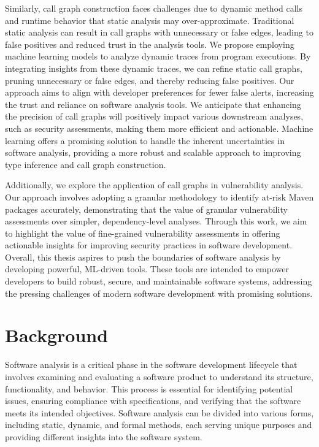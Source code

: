 Similarly, call graph construction faces challenges due to dynamic method calls and runtime behavior that static analysis may over-approximate. Traditional static analysis can result in call graphs with unnecessary or false edges, leading to false positives and reduced trust in the analysis tools. We propose employing machine learning models to analyze dynamic traces from program executions. By integrating insights from these dynamic traces, we can refine static call graphs, pruning unnecessary or false edges, and thereby reducing false positives. Our approach aims to align with developer preferences for fewer false alerts, increasing the trust and reliance on software analysis tools. We anticipate that enhancing the precision of call graphs will positively impact various downstream analyses, such as security assessments, making them more efficient and actionable. Machine learning offers a promising solution to handle the inherent uncertainties in software analysis, providing a more robust and scalable approach to improving type inference and call graph construction.

Additionally, we explore the application of call graphs in vulnerability analysis. Our approach involves adopting a granular methodology to identify at-risk Maven packages accurately, demonstrating that the value of granular vulnerability assessments over simpler, dependency-level analyses. Through this work, we aim to highlight the value of fine-grained vulnerability assessments in offering actionable insights for improving security practices in software development. Overall, this thesis aspires to push the boundaries of software analysis by developing powerful, ML-driven tools. These tools are intended to empower developers to build robust, secure, and maintainable software systems, addressing the pressing challenges of modern software development with promising solutions.

\section{Background}
Software analysis is a critical phase in the software development lifecycle that involves examining and evaluating a software product to understand its structure, functionality, and behavior. This process is essential for identifying potential issues, ensuring compliance with specifications, and verifying that the software meets its intended objectives. Software analysis can be divided into various forms, including static, dynamic, and formal methods, each serving unique purposes and providing different insights into the software system.

